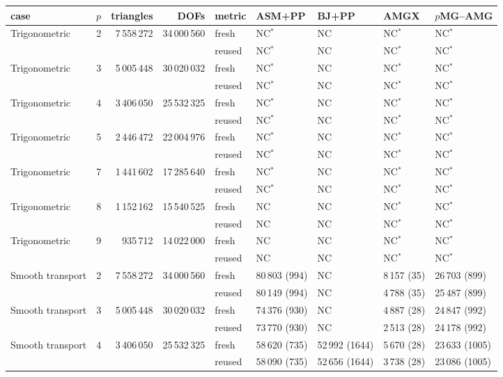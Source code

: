 \begin{tabular}{lrrrlllll}
\toprule
case & $p$ & triangles & DOFs & metric & ASM+PP & BJ+PP & AMGX & $p$MG--AMG \\
\midrule
Trigonometric & 2 & 7\,558\,272 & 34\,000\,560 & fresh & NC$^*$ & NC & NC$^*$ & NC$^*$\\
 & & &  & reused & NC$^*$ & NC & NC$^*$ & NC$^*$\\
\addlinespace[2pt]
Trigonometric & 3 & 5\,005\,448 & 30\,020\,032 & fresh & NC$^*$ & NC & NC$^*$ & NC$^*$\\
 & & &  & reused & NC$^*$ & NC & NC$^*$ & NC$^*$\\
\addlinespace[2pt]
Trigonometric & 4 & 3\,406\,050 & 25\,532\,325 & fresh & NC$^*$ & NC & NC$^*$ & NC$^*$\\
 & & &  & reused & NC$^*$ & NC & NC$^*$ & NC$^*$\\
\addlinespace[2pt]
Trigonometric & 5 & 2\,446\,472 & 22\,004\,976 & fresh & NC$^*$ & NC & NC$^*$ & NC$^*$\\
 & & &  & reused & NC$^*$ & NC & NC$^*$ & NC$^*$\\
\addlinespace[2pt]
Trigonometric & 7 & 1\,441\,602 & 17\,285\,640 & fresh & NC$^*$ & NC & NC$^*$ & NC$^*$\\
 & & &  & reused & NC$^*$ & NC & NC$^*$ & NC$^*$\\
\addlinespace[2pt]
Trigonometric & 8 & 1\,152\,162 & 15\,540\,525 & fresh & NC & NC & NC$^*$ & NC$^*$\\
 & & &  & reused & NC & NC & NC$^*$ & NC$^*$\\
\addlinespace[2pt]
Trigonometric & 9 & 935\,712 & 14\,022\,000 & fresh & NC & NC & NC$^*$ & NC$^*$\\
 & & &  & reused & NC & NC & NC$^*$ & NC$^*$\\
\addlinespace[2pt]
Smooth transport & 2 & 7\,558\,272 & 34\,000\,560 & fresh & 80\,803 (994) & NC & 8\,157 (35) & 26\,703 (899)\\
 & & &  & reused & 80\,149 (994) & NC & 4\,788 (35) & 25\,487 (899)\\
\addlinespace[2pt]
Smooth transport & 3 & 5\,005\,448 & 30\,020\,032 & fresh & 74\,376 (930) & NC & 4\,887 (28) & 24\,847 (992)\\
 & & &  & reused & 73\,770 (930) & NC & 2\,513 (28) & 24\,178 (992)\\
\addlinespace[2pt]
Smooth transport & 4 & 3\,406\,050 & 25\,532\,325 & fresh & 58\,620 (735) & 52\,992 (1644) & 5\,670 (28) & 23\,633 (1005)\\
 & & &  & reused & 58\,090 (735) & 52\,656 (1644) & 3\,738 (28) & 23\,086 (1005)\\

\end{tabular}
